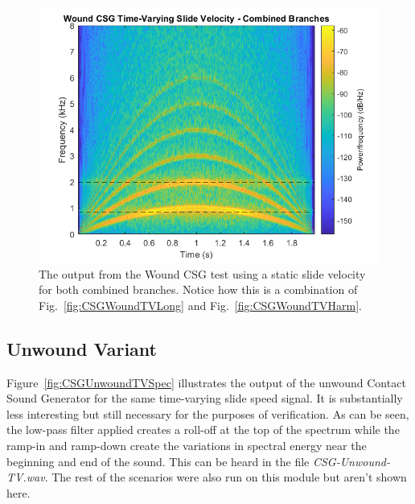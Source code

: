 \documentclass[../main.tex]{subfiles}
\begin{document}
\begin{figure}[b]
    \centering
    \includegraphics[scale=.60]{./images/plots/CSG_Wound_TV_Both.png}
    \caption{The output from the Wound CSG test using a static slide velocity for both combined branches. Notice how this is a combination of Fig.~\ref{fig:CSGWoundTVLong} and Fig.~\ref{fig:CSGWoundTVHarm}.}
    \label{fig:CSGWoundTVBoth}
\end{figure}

\clearpage

\subsection{Unwound Variant}
Figure~\ref{fig:CSGUnwoundTVSpec} illustrates the output of the unwound Contact Sound Generator for the same time-varying slide speed signal. It is substantially less interesting but still necessary for the purposes of verification. As can be seen, the low-pass filter applied creates a roll-off at the top of the spectrum while the ramp-in and ramp-down create the variations in spectral energy near the beginning and end of the sound. This can be heard in the file \emph{CSG-Unwound-TV.wav}. The rest of the scenarios were also run on this module but aren't shown here.
\end{document}
